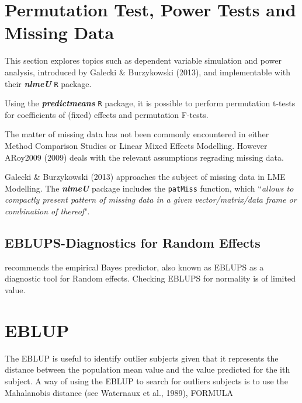 \documentclass[12pt, a4paper]{report}
\theoremstyle{plain}
\theoremstyle{definition}
\theoremstyle{remark}
\begin{document}
	

	
	\section*{Permutation Test, Power Tests and Missing Data }
	
	This section explores topics such as dependent variable simulation and power analysis, introduced by Galecki \& Burzykowski (2013), and implementable with their \textbf{\textit{nlmeU}} \texttt{R} package.
	
	Using the \textbf{\textit{predictmeans}} \texttt{R} package, it is possible to perform permutation t-tests for coefficients of (fixed) effects and permutation F-tests.
	
	The matter of missing data has not been commonly encountered in either Method Comparison Studies or Linear Mixed Effects Modelling. However ARoy2009 (2009) deals with the relevant assumptions regrading missing data. 
	
	Galecki \& Burzykowski (2013) approaches the subject of missing data in LME Modelling. The \textbf{\textit{nlmeU}} package includes the \texttt{patMiss} function, which ``\textit{allows to compactly present pattern of missing data in a given vector/matrix/data
		frame or combination of thereof}".
	
	
	
\subsection{EBLUPS-Diagnostics for Random Effects}
\citet{west} recommends the empirical Bayes predictor, also known as EBLUPS as a diagnostic tool for Random effects. Checking EBLUPS for normality is of limited value.


\section{EBLUP}


The EBLUP is useful to identify outlier subjects given that it represents the distance between the population mean value and the value predicted for the ith subject. A way of using the EBLUP to search for outliers subjects is to use the Mahalanobis distance (see Waternaux et al., 1989), FORMULA
\end{document}
